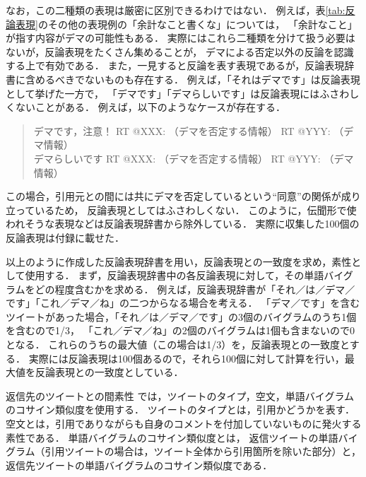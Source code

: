 \documentclass[japanese]{jnlp_1.4}
\newcommand{\addspan}[1]{}
\begin{document}
なお，この二種類の表現は厳密に区別できるわけではない．
例えば，表\ref{tab:反論表現}のその他の表現例の「余計なこと書くな」については，
「余計なこと」が指す内容がデマの可能性もある．
実際にはこれら二種類を分けて扱う必要はないが，反論表現をたくさん集めることが，
デマによる否定以外の反論を認識する上で有効である．
また，一見すると反論を表す表現であるが，反論表現辞書に含めるべきでないものも存在する．
例えば，「それはデマです」は反論表現として挙げた一方で，
「デマです」「デマらしいです」は反論表現にはふさわしくないことがある．
例えば，以下のようなケースが存在する．
\begin{quote}
デマです，注意！ RT @XXX: （デマを否定する情報） RT @YYY: （デマ情報） \\
デマらしいです RT @XXX: （デマを否定する情報） RT @YYY: （デマ情報）
\end{quote}
この場合，引用元との間には共にデマを否定しているという“同意”の関係が成り立っているため，
反論表現としてはふさわしくない．
このように，伝聞形で使われそうな表現などは反論表現辞書から除外している．
実際に収集した100個の反論表現は付録に載せた．

以上のように作成した反論表現辞書を用い，反論表現との一致度を求め，素性として使用する．
まず，反論表現辞書中の各反論表現に対して，その単語バイグラムをどの程度含むかを求める．
例えば，反論表現辞書が「それ／は／デマ／です」「これ／デマ／ね」の二つからなる場合を考える．
「デマ／です」を含むツイートがあった場合，「それ／は／デマ／です」の3個のバイグラムのうち1個を含むので1/3，
「これ／デマ／ね」の2個のバイグラムは1個も含まないので0となる．
これらのうちの最大値（この場合は1/3）を，反論表現との一致度とする．
実際には反論表現は100個あるので，それら100個に対して計算を行い，最大値を反論表現との一致度としている．

返信先のツイートとの間\addspan{の関係についての}素性
では，ツイートのタイプ，空文，単語バイグラムのコサイン類似度を使用する．
ツイートのタイプとは，引用かどうかを表す．
空文とは，引用でありながらも自身のコメントを付加していないものに発火する素性である．
単語バイグラムのコサイン類似度とは，
返信ツイートの単語バイグラム（引用ツイートの場合は，ツイート全体から引用箇所を除いた部分）と，
返信先ツイートの単語バイグラムのコサイン類似度である．
\end{document}
